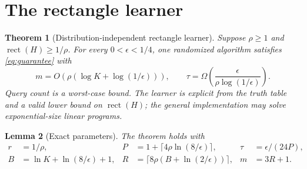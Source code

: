 \documentclass[11pt]{article}
\newtheorem{theorem}{Theorem}
\newtheorem{lemma}[theorem]{Lemma}
\DeclareMathOperator{\rect}{rect}
\newcommand{\1}{\mathbf 1}
\begin{document}
\section{The rectangle learner}
\begin{samepage}
\begin{theorem}[Distribution-independent rectangle learner]\label{thm:main}
Suppose $\rho\ge1$ and $\rect(H)\ge1/\rho$. For every $0<\epsilon<1/4$, one randomized algorithm satisfies \eqref{eq:guarantee} with
\[
 m=O\!\left(\rho(\log K+\log(1/\epsilon))\right),\qquad
 \tau=\Omega\!\left(\frac{\epsilon}{\rho\log(1/\epsilon)}\right).
\]
Query count is a worst-case bound. The learner is explicit from the truth table and a valid lower bound on $\rect(H)$; the general implementation may solve exponential-size linear programs.
\end{theorem}
\end{samepage}
\begin{samepage}
\begin{lemma}[Exact parameters]\label{lem:params}
The theorem holds with
\begin{align}
 r&=1/\rho,&P&=1+\lceil4\rho\ln(8/\epsilon)\rceil,&\tau&=\epsilon/(24P),\label{eq:params1}\\
 B&=\ln K+\ln(8/\epsilon)+1,&R&=\lceil8\rho(B+\ln(2/\epsilon))\rceil,&m&=3R+1.\label{eq:params2}
\end{align}
\end{lemma}
\end{samepage}
\end{document}
